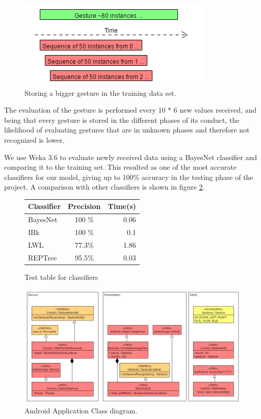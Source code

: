 \begin{figure}[!h]
\centering
\includegraphics[width=1\columnwidth]{img/gesture_window_example}
\caption{Storing a bigger gesture in the training data set.}
\label{fig:training}
\end{figure}

The evaluation of the gesture is performed every 10 * 6 new values received,
 and being that every gesture is stored in the different phases of its conduct,
  the likelihood of evaluating gestures that are in unknown phases and therefore not recognized is lower.

We use Weka 3.6 to evaluate newly received data using a BayesNet classifier and comparing it to the training set. 
This resulted as one of the most accurate classifiers for our model, giving up to 100\% accuracy in the testing phase of the project. A comparison with other classifiers is shown in figure \ref{fig:wekaclass}.

\begin{figure}[h]
\begin{center}
\begin{tabular}{ l  c r }
Classifier & Precision & Time(s)\\ [0.5ex]
\hline \hline
BayesNet & 100 \%  & 0.06\\ 
IBk & 100 \% & 0.1 \\
LWL & 77.3\%  & 1.86\\
REPTree & 95.5\%  & 0.03 \\ [1ex]
\end{tabular}
\end{center}
\caption{Test table for classifiers}
\label{fig:wekaclass}
\end{figure}

\begin{figure}[!h]
\centering
\includegraphics[width=1\columnwidth]{img/android_class_diagram}
\caption{Android Application Class diagram.}
\label{fig:and_class}
\end{figure}

